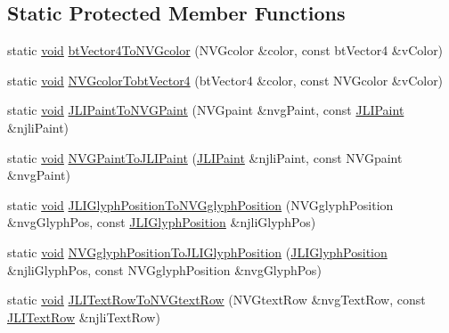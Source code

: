 \subsection*{Static Protected Member Functions}
\begin{DoxyCompactItemize}
\item 
static \mbox{\hyperlink{_thread_8h_af1e856da2e658414cb2456cb6f7ebc66}{void}} \mbox{\hyperlink{classnjli_1_1_world_h_u_d_aabaa1466701198abf39dd94cb9109b2f}{bt\+Vector4\+To\+N\+V\+Gcolor}} (N\+V\+Gcolor \&color, const bt\+Vector4 \&v\+Color)
\item 
static \mbox{\hyperlink{_thread_8h_af1e856da2e658414cb2456cb6f7ebc66}{void}} \mbox{\hyperlink{classnjli_1_1_world_h_u_d_a0f4a1e7b62c85ee6176e90963abc3dc3}{N\+V\+Gcolor\+Tobt\+Vector4}} (bt\+Vector4 \&color, const N\+V\+Gcolor \&v\+Color)
\item 
static \mbox{\hyperlink{_thread_8h_af1e856da2e658414cb2456cb6f7ebc66}{void}} \mbox{\hyperlink{classnjli_1_1_world_h_u_d_ac3b9b4cf14d03ba84789791fe171513e}{J\+L\+I\+Paint\+To\+N\+V\+G\+Paint}} (N\+V\+Gpaint \&nvg\+Paint, const \mbox{\hyperlink{structnjli_1_1_j_l_i_paint}{J\+L\+I\+Paint}} \&njli\+Paint)
\item 
static \mbox{\hyperlink{_thread_8h_af1e856da2e658414cb2456cb6f7ebc66}{void}} \mbox{\hyperlink{classnjli_1_1_world_h_u_d_a85633ec6492ef69686611f75c7453659}{N\+V\+G\+Paint\+To\+J\+L\+I\+Paint}} (\mbox{\hyperlink{structnjli_1_1_j_l_i_paint}{J\+L\+I\+Paint}} \&njli\+Paint, const N\+V\+Gpaint \&nvg\+Paint)
\item 
static \mbox{\hyperlink{_thread_8h_af1e856da2e658414cb2456cb6f7ebc66}{void}} \mbox{\hyperlink{classnjli_1_1_world_h_u_d_acb08db72dc0fc77fdc5b5ba97d7861b6}{J\+L\+I\+Glyph\+Position\+To\+N\+V\+Gglyph\+Position}} (N\+V\+Gglyph\+Position \&nvg\+Glyph\+Pos, const \mbox{\hyperlink{structnjli_1_1_j_l_i_glyph_position}{J\+L\+I\+Glyph\+Position}} \&njli\+Glyph\+Pos)
\item 
static \mbox{\hyperlink{_thread_8h_af1e856da2e658414cb2456cb6f7ebc66}{void}} \mbox{\hyperlink{classnjli_1_1_world_h_u_d_a13e6d9af851da8945d118b874eb5ab94}{N\+V\+Gglyph\+Position\+To\+J\+L\+I\+Glyph\+Position}} (\mbox{\hyperlink{structnjli_1_1_j_l_i_glyph_position}{J\+L\+I\+Glyph\+Position}} \&njli\+Glyph\+Pos, const N\+V\+Gglyph\+Position \&nvg\+Glyph\+Pos)
\item 
static \mbox{\hyperlink{_thread_8h_af1e856da2e658414cb2456cb6f7ebc66}{void}} \mbox{\hyperlink{classnjli_1_1_world_h_u_d_a63de1c69b918742522b6035270b6e635}{J\+L\+I\+Text\+Row\+To\+N\+V\+Gtext\+Row}} (N\+V\+Gtext\+Row \&nvg\+Text\+Row, const \mbox{\hyperlink{structnjli_1_1_j_l_i_text_row}{J\+L\+I\+Text\+Row}} \&njli\+Text\+Row)

\end{DoxyCompactItemize}

